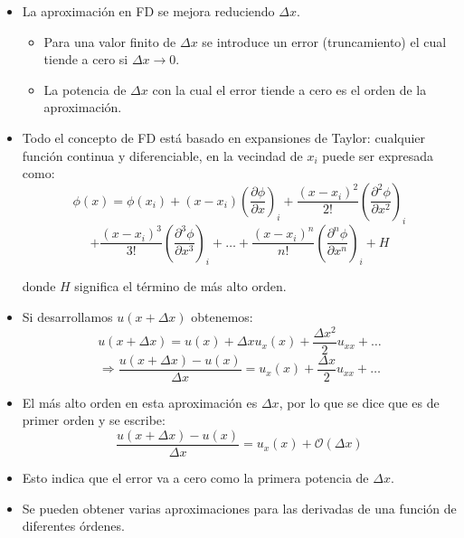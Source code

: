 \documentclass[handout]{beamer}
\begin{document}
\begin{frame}
  \begin{itemize}[<+->]
  \item La aproximaci\'on en FD se mejora reduciendo $\Delta x$. 
    \begin{itemize}
    \item Para una valor finito
      de $\Delta x$ se introduce un error (truncamiento) el cual tiende a cero si 
      $\Delta x \to 0$.
    \item La potencia de $\Delta x$ con la cual el error tiende a cero es el orden de la
      aproximaci\'on.
    \end{itemize}
  \item Todo el concepto de FD est\'a basado en expansiones de Taylor: cualquier funci\'on
    continua y diferenciable, en la vecindad de $x_i$ puede ser expresada como:
{\small{
    \[
    \phi(x) = \phi(x_i) + (x-x_i)\left(\frac{\partial \phi}{\partial x}\right)_i
    + \frac{(x-x_i)^2}{2!}\left(\frac{\partial^2 \phi}{\partial x^2}\right)_i
    \]
    \[
    + \frac{(x-x_i)^3}{3!}\left(\frac{\partial^3 \phi}{\partial x^3}\right)_i + \dots
    + \frac{(x-x_i)^n}{n!}\left(\frac{\partial^n \phi}{\partial x^n}\right)_i + H
    \]
}}

\noindent donde $H$ significa el t\'ermino de m\'as alto orden.
  \end{itemize}
\end{frame}

\begin{frame}
  \begin{itemize}[<+->]
  \item Si desarrollamos $u(x+\Delta x)$ obtenemos:
    \[
    u(x+\Delta x) = u(x) + \Delta x u_x(x) + \frac{\Delta x^2}{2} u_{xx} + \dots
    \]
    \[
    \Longrightarrow
    \frac{u(x+\Delta x)-u(x)}{\Delta x} = u_x(x) + \frac{\Delta x}{2} u_{xx} + \dots
    \]

  \item El m\'as alto orden en esta aproximaci\'on es $\Delta x$, por lo que se dice
    que es de primer orden y se escribe:
    \[
    \frac{u(x+\Delta x)-u(x)}{\Delta x} = u_x(x) + \mathcal{O}(\Delta x)
    \]
  \item Esto indica que el error va a cero como la primera potencia de $\Delta x$.
  \item Se pueden obtener varias aproximaciones para las derivadas de una funci\'on de
    diferentes \'ordenes.
  \end{itemize}
\end{frame}
\end{document}
